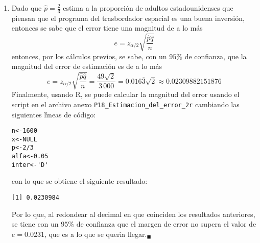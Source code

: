 \begin{solucion}
\begin{enumerate}
\begin{eqnarray*}
   & = & \frac{2}{3} \pm \frac{49\sqrt{2}}{3\,000} = 0.\overline{6} \pm 0.016\overline{3}\sqrt{2} \approx 0.\overline{6}\pm 0.02309882151876
  \end{eqnarray*}
  Por lo tanto, el intervalo de confianza de $95\%$ de la proporci\'on de adultos estadounidenses que piensan que el programa del trasbordador espacial es una buena inversi\'on para el pa\'{\i}s es aproximadamente
  \begin{equation*}
   0.6435678451479 < p < 0.6897654881854
  \end{equation*}
  Por otro lado, usando R, se puede calcular el intervalo de confianza usando el scripten el archivo anexo \texttt{P17\_Intervalo\_de\_confianza\_08.r} cambiando las siguientes l\'{\i}neas de c\'odigo:
  \begin{verbatim}
n<-1600
x<-NULL
p<-2/3
alfa<-0.05
inter<-'D'
  \end{verbatim}
  \vspace{-0.5cm}
  con lo que se obtiene el siguiente resultado:
  \begin{verbatim}
     LimInf Proporción    LimSup
1 0.6435683  0.6666667 0.6897651
  \end{verbatim}
  \vspace{-0.5cm}
  por lo que, al redondear al decimal en que coinciden los resultados anteriores, se tiene que el intervalo de confianza del $95\%$ es $0.64357 < p < 0.68976$.${}_{\square}$
  
  \item Dado que $\hat{p} = \frac{2}{3}$ estima a la proporci\'on de adultos estadounidenses que piensan que el programa del trasbordador espacial es una buena inversi\'on, entonces se sabe que el error tiene una magnitud de a lo m\'as
  \begin{equation*}
   e = z_{\alpha/2}\sqrt{\frac{\hat{p}\hat{q}}{n}}
  \end{equation*}
  entonces, por los c\'alculos previos, se sabe, con un $95\%$ de confianza, que la magnitud del error de estimaci\'on es de a lo m\'as
  \begin{equation*}
   e = z_{\alpha/2}\sqrt{\frac{\hat{p}\hat{q}}{n}} = \frac{49\sqrt{2}}{3\,000} = 0.016\overline{3}\sqrt{2} \approx 0.02309882151876
  \end{equation*}
  Finalmente, usando R, se puede calcular la magnitud del error usando el script en el archivo anexo \texttt{P18\_Estimacion\_del\_error\_2r} cambiando las siguientes l\'{\i}neas de c\'odigo:
  \begin{verbatim}
n<-1600
x<-NULL
p<-2/3
alfa<-0.05
inter<-'D'
  \end{verbatim}
  \vspace{-0.5cm}
  con lo que se obtiene el siguiente resultado:
  \begin{verbatim}
[1] 0.0230984
  \end{verbatim}
  \vspace{-0.5cm}
  Por lo que, al redondear al decimal en que coinciden los resultados anteriores, se tiene con un $95\%$ de confianza que el margen de error no supera el valor de $e = 0.0231$, que es a lo que se quer\'{\i}a llegar.${}_{\blacksquare}$
 \end{enumerate}

\end{solucion}
